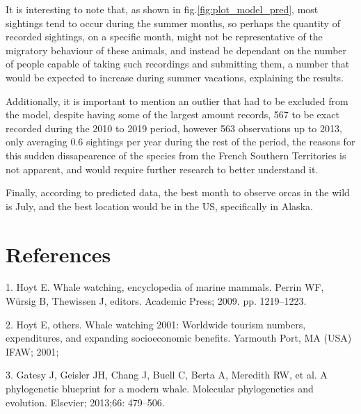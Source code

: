 \documentclass[10pt,letterpaper]{article}
\begin{document}
It is interesting to note that, as shown in
fig.\ref{fig:plot_model_pred}, most sightings tend to occur during the
summer months, so perhaps the quantity of recorded sightings, on a
specific month, might not be representative of the migratory behaviour
of these animals, and instead be dependant on the number of people
capable of taking such recordings and submitting them, a number that
would be expected to increase during summer vacations, explaining the
results.

Additionally, it is important to mention an outlier that had to be
excluded from the model, despite having some of the largest amount
records, 567 to be exact recorded during the 2010 to 2019 period,
however 563 observations up to 2013, only averaging 0.6 sightings per
year during the rest of the period, the reasons for this sudden
dissapearence of the species from the French Southern Territories is not
apparent, and would require further research to better understand it.

Finally, according to predicted data, the best month to observe orcas in
the wild is July, and the best location would be in the US, specifically
in Alaska.

\hypertarget{references}{%
\section*{References}\label{references}}

\hypertarget{refs}{}
\leavevmode\hypertarget{ref-perrin2009encyclopedia}{}%
1. Hoyt E. Whale watching, encyclopedia of marine mammals. Perrin WF,
Würsig B, Thewissen J, editors. Academic Press; 2009. pp. 1219--1223.

\leavevmode\hypertarget{ref-hoyt2001whale}{}%
2. Hoyt E, others. Whale watching 2001: Worldwide tourism numbers,
expenditures, and expanding socioeconomic benefits. Yarmouth Port, MA
(USA) IFAW; 2001;

\leavevmode\hypertarget{ref-gatesy2013phylogenetic}{}%
3. Gatesy J, Geisler JH, Chang J, Buell C, Berta A, Meredith RW, et al.
A phylogenetic blueprint for a modern whale. Molecular phylogenetics and
evolution. Elsevier; 2013;66: 479--506.

\nolinenumbers
\end{document}
